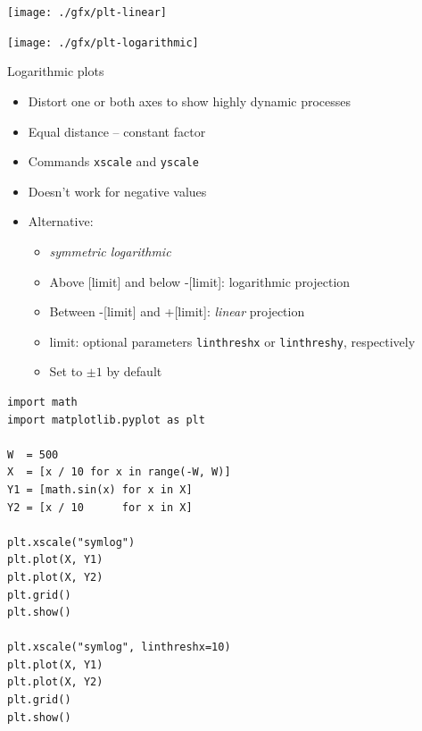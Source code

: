 
\begin{frame}[fragile]
%
\begin{tcbraster}[raster columns=2,
                  raster equal height,
                  nobeforeafter,
                  raster column skip=0.5cm]
\begin{tcolorbox}[title=Linear Plot]
	\texttt{[image: ./gfx/plt-linear]}
\end{tcolorbox}
%
\begin{tcolorbox}[title=Logarithmic Plot]
	\texttt{[image: ./gfx/plt-logarithmic]}
\end{tcolorbox}
\end{tcbraster}
%
\end{frame}


\begin{frame}[fragile]{Logarithmic plots}
%
\begin{itemize}
\item Distort one or both axes to show highly dynamic processes
\item Equal distance -- constant factor
\item Commands \texttt{xscale} and \texttt{yscale}
\item Doesn't work for negative values
\item Alternative: 
	\begin{itemize}
	\item \emph{symmetric logarithmic}
	\item Above [limit] and below -[limit]: logarithmic projection
	\item Between -[limit] and +[limit]: \emph{linear} projection
	\item limit: optional parameters \texttt{linthreshx} or \texttt{linthreshy}, respectively
	\item Set to $\pm 1$ by default
	\end{itemize}
\end{itemize}
%
\end{frame}


\begin{frame}[fragile]
%
\begin{codebox}
\begin{verbatim}
import math
import matplotlib.pyplot as plt

W  = 500
X  = [x / 10 for x in range(-W, W)]
Y1 = [math.sin(x) for x in X]
Y2 = [x / 10      for x in X]

plt.xscale("symlog")
plt.plot(X, Y1)
plt.plot(X, Y2)
plt.grid()
plt.show()

plt.xscale("symlog", linthreshx=10)
plt.plot(X, Y1)
plt.plot(X, Y2)
plt.grid()
plt.show()
\end{verbatim}
\end{codebox}
%
\end{frame}

